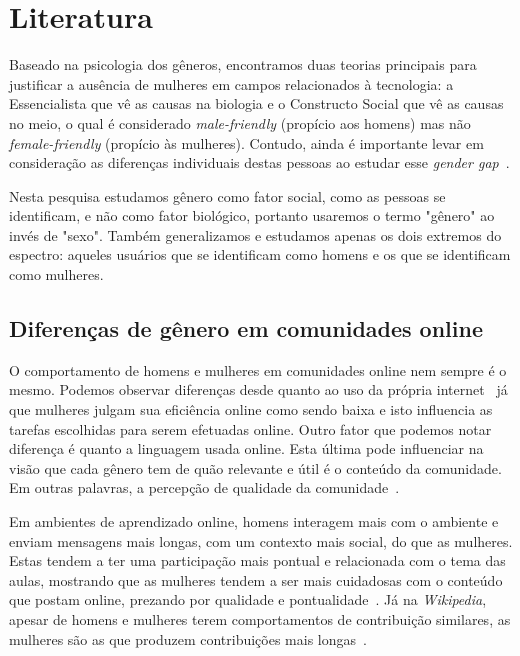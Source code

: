\chapter{Literatura}
\label{ch:literatura}

Baseado na psicologia dos gêneros, encontramos duas teorias principais para justificar a ausência de mulheres em campos relacionados à tecnologia: a Essencialista que vê as causas na biologia e o Constructo Social que vê as causas no meio, o qual é considerado \emph{male-friendly} (propício aos homens) mas não \emph{female-friendly} (propício às mulheres). Contudo, ainda é importante levar em consideração as diferenças individuais destas pessoas ao estudar esse \emph{gender gap}~\cite{trauth2004understanding}.

Nesta pesquisa estudamos gênero como fator social, como as pessoas se identificam, e não como fator biológico, portanto usaremos o termo "gênero" ao invés de "sexo". Também generalizamos e estudamos apenas os dois extremos do espectro: aqueles usuários que se identificam como homens e os que se identificam como mulheres. 

\section{Diferenças de gênero em comunidades online}

O comportamento de homens e mulheres em comunidades online nem sempre é o mesmo. Podemos observar diferenças desde quanto ao uso da própria internet~\cite{hargittai2006differences} já que mulheres julgam sua eficiência online como sendo baixa e isto influencia as tarefas escolhidas para serem efetuadas online. Outro fator que podemos notar diferença é quanto a linguagem usada online. Esta última pode influenciar na visão que cada gênero tem  de quão relevante e útil é o conteúdo da comunidade. Em outras palavras, a percepção de qualidade da comunidade~\cite{Gefen:2005:YSS:1066149.1066156}. 

Em ambientes de aprendizado online, homens interagem mais com o ambiente e enviam mensagens mais longas, com um contexto mais social, do que as mulheres. Estas tendem a ter uma participação mais pontual e relacionada com o tema das aulas, mostrando que as mulheres tendem a ser mais cuidadosas com o conteúdo que postam online, prezando por qualidade e pontualidade~\cite{barrett1999gender}. Já na \emph{Wikipedia}, apesar de homens e mulheres terem comportamentos de contribuição similares, as mulheres são as que produzem contribuições mais longas~\cite{glott2010wikipedia}.

